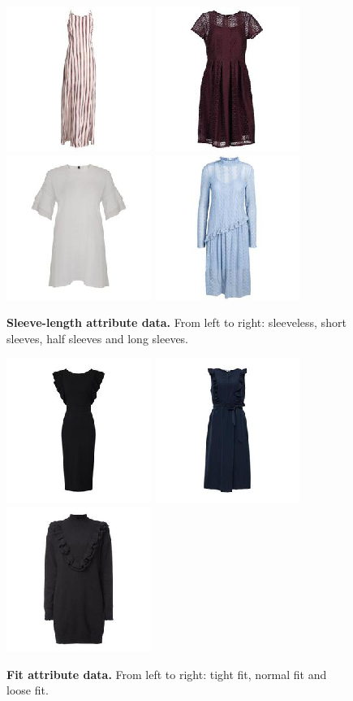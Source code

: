 \documentclass[12pt]{report}
\begin{document}
\begin{figure}[!h]
\centering
{\includegraphics[width=.2\linewidth]{03_analysis/data/sleeves_none}}
{\includegraphics[width=.2\linewidth]{03_analysis/data/sleeves_short}}
{\includegraphics[width=.2\linewidth]{03_analysis/data/sleeves_half}}
{\includegraphics[width=.2\linewidth]{03_analysis/data/sleeves_long}}
\caption{\label{fig:sleeve_data} \textbf{Sleeve-length attribute data.} From left to right: sleeveless, short sleeves, half sleeves and long sleeves.}

{\includegraphics[width=.2\linewidth]{03_analysis/data/fit_tight}}
{\includegraphics[width=.2\linewidth]{03_analysis/data/fit_normal}}
{\includegraphics[width=.2\linewidth]{03_analysis/data/fit_loose}}
\caption{\label{fig:fit_data} \textbf{Fit attribute data.} From left to right: tight fit, normal fit and loose fit.}


\end{figure}
\end{document}
